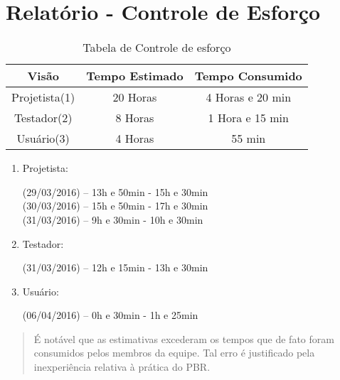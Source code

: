 \documentclass[12pt,a4paper,final]{report}
\begin{document}
\section*{Relatório - Controle de Esforço}
\vspace{0.75cm}
\begin{table*}[ht]
	 \centering
\begin{tabular}{||c|c|c||}\hline
	\textbf{Visão} & \textbf{Tempo Estimado} & \textbf{Tempo Consumido} \\ \hline
	Projetista(1) & 20 Horas & 4 Horas e 20 min \\ \hline
	Testador(2) & 8 Horas & 1 Hora e 15 min \\ \hline
	Usuário(3) & 4 Horas & 55 min \\ \hline
\end{tabular} 
\caption{Tabela de Controle de esforço}
\end{table*}
\vspace{0.75cm}
\begin{enumerate}
	
\item Projetista: 

	
	\textbullet(29/03/2016) -- 13h e 50min  - 15h e 30min \\
	\textbullet(30/03/2016) -- 15h e 50min  - 17h e 30min \\
	\textbullet(31/03/2016) -- 9h e 30min  - 10h e 30min 

  

\item Testador:

	\textbullet(31/03/2016) -- 12h e 15min - 13h e 30min

\item Usuário: 

	\textbullet(06/04/2016) -- 0h e 30min - 1h e 25min
 
\end{enumerate}
\vspace{0.75cm}
\begin{quotation}
	\checkmark É notável que as estimativas excederam os tempos que de fato foram consumidos pelos membros da equipe. Tal erro é justificado pela inexperiência relativa à prática do PBR.
\end{quotation}
\end{document}
